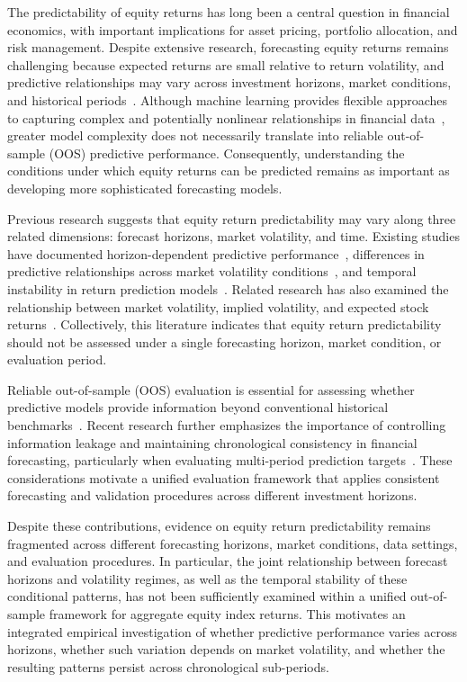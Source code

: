 \documentclass[runningheads,orivec]{llncs}
\begin{document}
The predictability of equity returns has long been a central question in financial economics, with important implications for asset pricing, portfolio allocation, and risk management. Despite extensive research, forecasting equity returns remains challenging because expected returns are small relative to return volatility, and predictive relationships may vary across investment horizons, market conditions, and historical periods~\cite{campbell1998,welch2008}. Although machine learning provides flexible approaches to capturing complex and potentially nonlinear relationships in financial data~\cite{gu2020}, greater model complexity does not necessarily translate into reliable out-of-sample (OOS) predictive performance. Consequently, understanding the conditions under which equity returns can be predicted remains as important as developing more sophisticated forecasting models.

Previous research suggests that equity return predictability may vary along three related dimensions: forecast horizons, market volatility, and time. Existing studies have documented horizon-dependent predictive performance~\cite{nechvatalova2024,xu2020}, differences in predictive relationships across market volatility conditions~\cite{baltas2018,cakici2025}, and temporal instability in return prediction models~\cite{harvey2021,paye2006}. Related research has also examined the relationship between market volatility, implied volatility, and expected stock returns~\cite{banerjee2007,bekaert2014,french1987}. Collectively, this literature indicates that equity return predictability should not be assessed under a single forecasting horizon, market condition, or evaluation period.

Reliable out-of-sample (OOS) evaluation is essential for assessing whether predictive models provide information beyond conventional historical benchmarks~\cite{campbell2008,welch2008}. Recent research further emphasizes the importance of controlling information leakage and maintaining chronological consistency in financial forecasting, particularly when evaluating multi-period prediction targets~\cite{hewamalage2023,perez2026,tashman2000}. These considerations motivate a unified evaluation framework that applies consistent forecasting and validation procedures across different investment horizons.

Despite these contributions, evidence on equity return predictability remains fragmented across different forecasting horizons, market conditions, data settings, and evaluation procedures. In particular, the joint relationship between forecast horizons and volatility regimes, as well as the temporal stability of these conditional patterns, has not been sufficiently examined within a unified out-of-sample framework for aggregate equity index returns. This motivates an integrated empirical investigation of whether predictive performance varies across horizons, whether such variation depends on market volatility, and whether the resulting patterns persist across chronological sub-periods.
\end{document}
